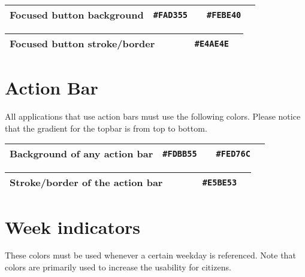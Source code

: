 \begin{table}[!htbp]
	\begin{tabularx}{\textwidth}{X r c r c}
		Focused button background 
		& \texttt{\#FAD355} & \cellcolor[HTML]{FAD355}\phantom{--}
		& \texttt{\#FEBE40} & \cellcolor[HTML]{FEBE40}\phantom{--} \\ \hline
	\end{tabularx}
\end{table}

\begin{table}[!htbp]
	\begin{tabularx}{\textwidth}{X r c r c}
		Focused button stroke/border 
		& ~ & ~
		& \texttt{\#E4AE4E} & \cellcolor[HTML]{E4AE4E}\phantom{--} \\ \hline
	\end{tabularx}
\end{table}


\section{Action Bar}
All applications that use action bars must use the following colors. Please notice that the gradient for the topbar is from top to bottom.

\begin{table}[!htbp]
	\begin{tabularx}{\textwidth}{X r c r c}
		Background of any action bar 
		& \texttt{\#FDBB55} & \cellcolor[HTML]{FDBB55}\phantom{--}
		& \texttt{\#FED76C} & \cellcolor[HTML]{FED76C}\phantom{--} \\ \hline
	\end{tabularx}
\end{table}

\begin{table}[!htbp]
	\begin{tabularx}{\textwidth}{X r c r c}
		Stroke/border of the action bar 
		& ~ & ~
		& \texttt{\#E5BE53} & \cellcolor[HTML]{E5BE53}\phantom{--} \\ \hline
	\end{tabularx}
\end{table}


\section{Week indicators}
These colors must be used whenever a certain weekday is referenced. Note that colors are primarily used to increase the usability for citizens.


